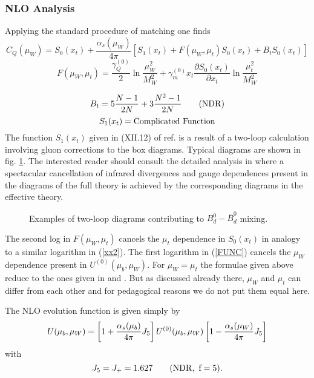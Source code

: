 \documentclass[12pt]{article}
\def\as{\alpha_s}
\newcommand{\be}{\begin{equation}}
\newcommand{\ee}{\end{equation}}
\begin{document}
\begin{itemize}
\begin{itemize}
\subsubsection{NLO Analysis}
Applying the standard procedure of matching one finds \cite{BJW90}
\be\label{NLOC}
C_Q(\mu_W)=S_0(x_t)+
\frac{\as(\mu_W)}{4\pi} \left[
S_1(x_t)+F(\mu_W,\mu_t)S_0(x_t)+B_t S_0(x_t)\right]
\ee
\be\label{FUNC}
F(\mu_W,\mu_t)=\frac{\gamma_Q^{(0)}}{2}
 \ln\frac{\mu^2_W}{M^2_W}+\gamma^{(0)}_{m} x_t
 \frac{\partial S_0(x_t)}{\partial x_t}\ln\frac{\mu^2_t}{M^2_W}
\ee

\begin{equation}\label{btndr}
B_t=5\frac{N-1}{2N}+3\frac{N^2-1}{2N}\qquad ({\rm NDR})
\end{equation}  
\be
S_1(x_t)= {\rm Complicated~Function}
\ee
The function $S_1(x_t)$ given in (XII.12) of ref. \cite{BBL}
is a result of a two-loop calculation \cite{BJW90} involving
gluon corrections to the box diagrams. Typical diagrams are shown in 
fig. \ref{L:8}.
The interested reader should consult the detailed analysis in \cite{BJW90}
where a spectacular cancellation of infrared divergences and gauge 
dependences present in the diagrams of the full theory is achieved by 
the corresponding diagrams in the effective theory.

\begin{figure}[hbt]
\vspace{0.10in}
\centerline{
\epsfysize=1.5in
}%
\vspace{0.08in}
\caption[]{Examples of two-loop diagrams contributing to 
$B_d^0-\bar B_d^0$ mixing.
\label{L:8}}
\end{figure}

The second log in $F(\mu_W,\mu_t)$ cancels the $\mu_t$
dependence in $S_0(x_t)$ in analogy to a similar logarithm in
(\ref{xx2}). The first logarithm in (\ref{FUNC}) cancels the
$\mu_W$ dependence present in $U^{(0)}(\mu_b,\mu_W)$.
For $\mu_W=\mu_t$ the formulae given above reduce to the ones given
in \cite{BJW90} and \cite{BBL}. But as discussed already there,
$\mu_W$ and $\mu_t$ can differ from each other and for
pedagogical reasons we do not put them equal here.

The NLO evolution function is given simply by
\begin{equation}\label{u02}
 U(\mu_b,\mu_W)=
\left[1+{\as(\mu_b)\over 4\pi} J_5 \right]  U^{(0)}(\mu_b,\mu_W) 
\left[1-{\as(\mu_W)\over 4\pi} J_5\right]
\end{equation}
with
\be
J_5=J_+=1.627
\qquad (\rm{NDR},~f=5).
\ee


\end{itemize}
\end{itemize}
\end{document}
